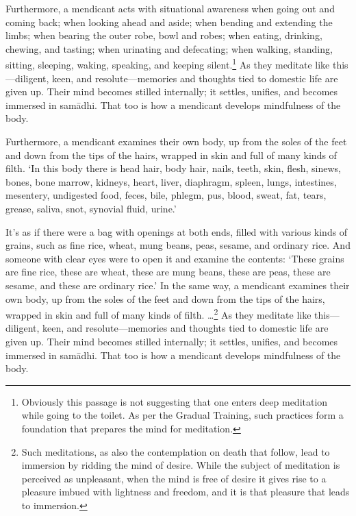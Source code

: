 \documentclass[12pt,openany]{book}%
\begin{document}
Furthermore, a mendicant acts with situational awareness when going out and coming back; when looking ahead and aside; when bending and extending the limbs; when bearing the outer robe, bowl and robes; when eating, drinking, chewing, and tasting; when urinating and defecating; when walking, standing, sitting, sleeping, waking, speaking, and keeping silent.\footnote{Obviously this passage is not suggesting that one enters deep meditation while going to the toilet. As per the Gradual Training, such practices form a foundation that prepares the mind for meditation. } As they meditate like this—diligent, keen, and resolute—memories and thoughts tied to domestic life are given up. Their mind becomes stilled internally; it settles, unifies, and becomes immersed in \textsanskrit{samādhi}. That too is how a mendicant develops mindfulness of the body. 

Furthermore, a mendicant examines their own body, up from the soles of the feet and down from the tips of the hairs, wrapped in skin and full of many kinds of filth. ‘In this body there is head hair, body hair, nails, teeth, skin, flesh, sinews, bones, bone marrow, kidneys, heart, liver, diaphragm, spleen, lungs, intestines, mesentery, undigested food, feces, bile, phlegm, pus, blood, sweat, fat, tears, grease, saliva, snot, synovial fluid, urine.’ 

It’s as if there were a bag with openings at both ends, filled with various kinds of grains, such as fine rice, wheat, mung beans, peas, sesame, and ordinary rice. And someone with clear eyes were to open it and examine the contents: ‘These grains are fine rice, these are wheat, these are mung beans, these are peas, these are sesame, and these are ordinary rice.’ In the same way, a mendicant examines their own body, up from the soles of the feet and down from the tips of the hairs, wrapped in skin and full of many kinds of filth. …\footnote{Such meditations, as also the contemplation on death that follow, lead to immersion by ridding the mind of desire. While the subject of meditation is perceived as unpleasant, when the mind is free of desire it gives rise to a pleasure imbued with lightness and freedom, and it is that pleasure that leads to immersion. } As they meditate like this—diligent, keen, and resolute—memories and thoughts tied to domestic life are given up. Their mind becomes stilled internally; it settles, unifies, and becomes immersed in \textsanskrit{samādhi}. That too is how a mendicant develops mindfulness of the body. 
\end{document}
